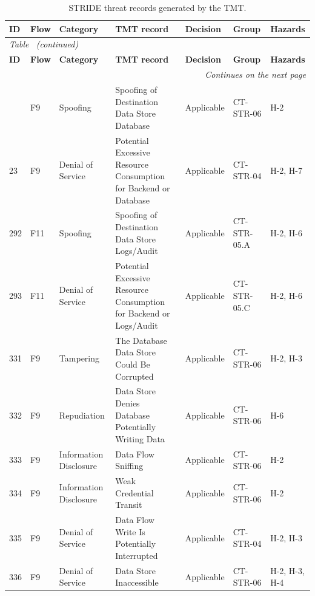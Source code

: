 \begin{footnotesize}
\begin{longtable}{l l p{} p{} p{} l p{}}
    \caption[STRIDE threat records generated by the TMT]{STRIDE threat records generated by the TMT.}
    \label{tab:stride_registros} \\
    \hline
    \textbf{ID} & \textbf{Flow} & \textbf{Category} & \textbf{TMT record} & \textbf{Decision} & \textbf{Group} & \textbf{Hazards} \\
    \hline
    \endfirsthead
    \multicolumn{7}{l}{\small\emph{Table~\thetable{} (continued)}} \\
    \hline
    \textbf{ID} & \textbf{Flow} & \textbf{Category} & \textbf{TMT record} & \textbf{Decision} & \textbf{Group} & \textbf{Hazards} \\
    \hline
    \endhead
    \hline
    \multicolumn{7}{r}{\small\emph{Continues on the next page}} \\
    \endfoot
    \hline
    \endlastfoot
        22 & F9 & Spoofing & Spoofing of Destination Data Store Database & Applicable & CT-STR-06 & H-2 \\
        23 & F9 & Denial of Service & Potential Excessive Resource Consumption for Backend or Database & Applicable & CT-STR-04 & H-2, H-7 \\
        292 & F11 & Spoofing & Spoofing of Destination Data Store Logs/Audit & Applicable & CT-STR-05.A & H-2, H-6 \\
        293 & F11 & Denial of Service & Potential Excessive Resource Consumption for Backend or Logs/Audit & Applicable & CT-STR-05.C & H-2, H-6 \\
        331 & F9 & Tampering & The Database Data Store Could Be Corrupted & Applicable & CT-STR-06 & H-2, H-3 \\
        332 & F9 & Repudiation & Data Store Denies Database Potentially Writing Data & Applicable & CT-STR-06 & H-6 \\
        333 & F9 & Information Disclosure & Data Flow Sniffing & Applicable & CT-STR-06 & H-2 \\
        334 & F9 & Information Disclosure & Weak Credential Transit & Applicable & CT-STR-06 & H-2 \\
        335 & F9 & Denial of Service & Data Flow Write Is Potentially Interrupted & Applicable & CT-STR-04 & H-2, H-3 \\
        336 & F9 & Denial of Service & Data Store Inaccessible & Applicable & CT-STR-06 & H-2, H-3, H-4 \\

\end{longtable}
\end{footnotesize}
